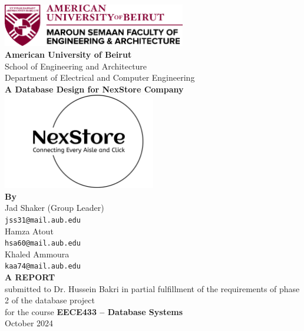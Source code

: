 \begin{center}
  \includegraphics[width=0.6\textwidth]{images/AUB-MSFEA.png} \\[1cm]
  
  \LARGE \textbf{American University of Beirut} \\
  \Large School of Engineering and Architecture \\
  \Large Department of Electrical and Computer Engineering \\
  \huge \textbf{A Database Design for NexStore Company} \\[1cm]
  
  \includegraphics[width=0.5\textwidth]{images/logo.png} \\[1cm]
  
  \Large \textbf{By} \\
  \large Jad Shaker (Group Leader) \\
  \texttt{jss31@mail.aub.edu} \\
  Hamza Atout \\
  \texttt{hsa60@mail.aub.edu} \\
  Khaled Ammoura \\
  \texttt{kaa74@mail.aub.edu} \\[1cm]
  
  \Large \textbf{A REPORT} \\
  submitted to Dr. Hussein Bakri in partial fulfillment of the requirements of phase 2 of the database project \\
  for the course \textbf{EECE433 -- Database Systems} \\[1cm]
  
  \large October 2024
\end{center}